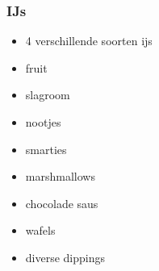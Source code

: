 \subsubsection{IJs}
\begin{itemize}
	\item	4 verschillende soorten  ijs
	\item	fruit
	\item	slagroom
	\item	nootjes
	\item	smarties
	\item	marshmallows
	\item	chocolade saus
	\item	wafels
	\item	diverse dippings
\end{itemize}
